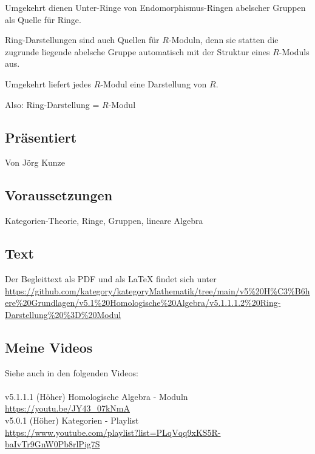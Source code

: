 \documentclass[a4paper]{amsart}
\theoremstyle{definition}
\begin{document}
Umgekehrt dienen Unter-Ringe von Endomorphismus-Ringen abelscher Gruppen als Quelle für Ringe.

Ring-Darstellungen sind auch Quellen für $R$-Moduln, denn sie statten die zugrunde liegende abelsche Gruppe automatisch mit der Struktur eines $R$-Moduls aus.

Umgekehrt liefert jedes $R$-Modul eine Darstellung von $R$.

Also: Ring-Darstellung = $R$-Modul

\subsection*{Präsentiert}
Von Jörg Kunze

\subsection*{Voraussetzungen}
Kategorien-Theorie, Ringe, Gruppen, lineare Algebra

\subsection*{Text}
Der Begleittext als PDF und als LaTeX findet sich unter
{\tiny
   \url{https://github.com/kategory/kategoryMathematik/tree/main/v5%20H%C3%B6here%20Grundlagen/v5.1%20Homologische%20Algebra/v5.1.1.1.2%20Ring-Darstellung%20%3D%20Modul}
}

\subsection*{Meine Videos}
Siehe auch in den folgenden Videos:\\
\\
v5.1.1.1 (Höher) Homologische Algebra - Moduln\\
\url{https://youtu.be/JY43_07kNmA}
\\
v5.0.1 (Höher) Kategorien - Playlist\\
\url{https://www.youtube.com/playlist?list=PLqVqq9xKS5R-baIvTr9GnW0Pb8rlPig7S}
\end{document}
